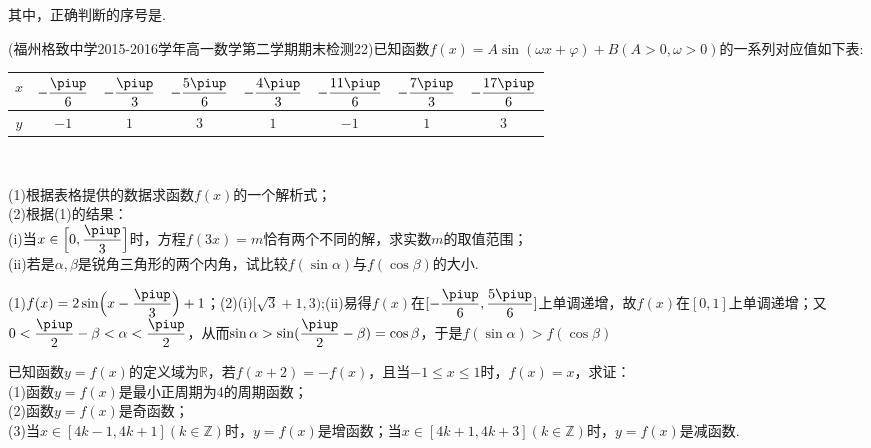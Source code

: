 \begin{exercise}
      其中，正确判断的序号是\tk.
      \begin{answer}
      \end{answer}
    \item%
      (福州格致中学2015-2016学年高一数学第二学期期末检测22)已知函数$f(x)=A\sin(\omega x+\varphi)+B (A>0,\omega>0)$的一系列对应值如下表:
      \begin{center}
        \renewcommand{\arraystretch}{1.4}
        \begin{tabular}{|*{8}{c|}}
          \hline
            $x$
            &$-\dfrac{\piup}6$
            &$-\dfrac{\piup}3$
            &$-\dfrac{5\piup}6$
            &$-\dfrac{4\piup}3$
            &$-\dfrac{11\piup}6$
            &$-\dfrac{7\piup}3$
            &$-\dfrac{17\piup}6$\\
          \hline
            $y$
            &$-1$
            &$1$
            &$3$
            &$1$
            &$-1$
            &$1$
            &$3$\\
          \hline
        \end{tabular}\\
      \end{center}
      (1)根据表格提供的数据求函数$f(x)$的一个解析式；\\
      (2)根据(1)的结果：\\
      \;(i)当$x\in\Bigl[0,\dfrac{\piup}3\Bigr]$时，方程$f(3x)=m$恰有两个不同的解，求实数$m$的取值范围；\\
      \;(ii)若是$\alpha,\beta$是锐角三角形的两个内角，试比较$f(\sin \alpha)$与$f(\cos \beta)$的大小.
      \begin{answer}
        (1)$f(x)=2\sin\Bigl(x-\dfrac{\piup}3\Bigr)+1$；(2)(i)$[\sqrt{3}+1,3)$;(ii)易得$f(x)$在$[-\dfrac{\piup}6,\dfrac{5\piup}6]$上单调递增，故$f(x)$在$[0,1]$上单调递增；又$0<\dfrac{\piup}2-\beta<\alpha<\dfrac{\piup}2$，从而$\sin\alpha>\sin(\dfrac{\piup}2-\beta)=\cos\beta$，于是$f(\sin \alpha)>f(\cos \beta)$
      \end{answer}
    \vspace{6.5cm}
    \item%
      已知函数$y=f(x)$的定义域为$\mathbb{R}$，若$f(x+2)=-f(x)$，且当$-1\leqslant x\leqslant 1$时，$f(x)=x$，求证：\\
      (1)函数$y=f(x)$是最小正周期为4的周期函数；\\
      (2)函数$y=f(x)$是奇函数；\\
      (3)当$x\in[4k-1,4k+1](k\in\mathbb{Z})$时，$y=f(x)$是增函数；当$x\in[4k+1,4k+3](k\in\mathbb{Z})$时，$y=f(x)$是减函数.
  \end{exercise}

